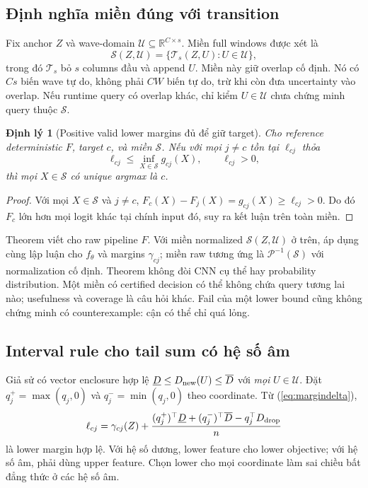 \documentclass[11pt,a4paper]{article}
\newcommand{\R}{\mathbb R}
\newcommand{\Sset}{\mathcal S}
\newcommand{\Uset}{\mathcal U}
\newtheorem{theorem}[proposition]{Định lý}
\theoremstyle{definition}
\begin{document}
\subsection{Định nghĩa miền đúng với transition}
Fix anchor $Z$ và wave-domain $\Uset\subseteq\R^{C\times s}$. Miền full
windows được xét là
\begin{equation}
\Sset(Z,\Uset)=\{\mathcal T_s(Z,U):U\in\Uset\},
\end{equation}
trong đó $\mathcal T_s$ bỏ $s$ columns đầu và append $U$. Miền này giữ
overlap cố định. Nó có $Cs$ biến wave tự do, không phải $CW$ biến tự do,
trừ khi còn đưa uncertainty vào overlap. Nếu runtime query có overlap
khác, chỉ kiểm $U\in\Uset$ chưa chứng minh query thuộc $\Sset$.

\begin{theorem}[Positive valid lower margins đủ để giữ target]
Cho reference deterministic $F$, target $c$, và miền $\Sset$. Nếu với
mọi $j\ne c$ tồn tại $\ell_{cj}$ thỏa
\begin{equation}
\ell_{cj}\le\inf_{X\in\Sset}g_{cj}(X),\qquad \ell_{cj}>0,
\end{equation}
thì mọi $X\in\Sset$ có unique argmax là $c$.
\end{theorem}
\begin{proof}
Với mọi $X\in\Sset$ và $j\ne c$,
$F_c(X)-F_j(X)=g_{cj}(X)\ge\ell_{cj}>0$. Do đó $F_c$ lớn hơn mọi logit
khác tại chính input đó, suy ra kết luận trên toàn miền.
\end{proof}
Theorem viết cho raw pipeline $F$. Với miền normalized $\Sset(Z,\Uset)$
ở trên, áp dụng cùng lập luận cho $f_\theta$ và margins $\gamma_{cj}$;
miền raw tương ứng là $\mathcal P^{-1}(\Sset)$ với normalization cố định.
Theorem không đòi CNN cụ thể hay probability distribution. Một miền có
certified decision có thể không chứa query tương lai nào; usefulness
và coverage là câu hỏi khác. Fail của một lower bound cũng không chứng
minh có counterexample: cận có thể chỉ quá lỏng.

\subsection{Interval rule cho tail sum có hệ số âm}
Giả sử có vector enclosure hợp lệ
$\underline D\le D_{\rm new}(U)\le\overline D$ với \emph{mọi}
$U\in\Uset$. Đặt $q_j^+=\max(q_j,0)$ và
$q_j^-=\min(q_j,0)$ theo coordinate. Từ
(\ref{eq:margindelta}),
\begin{equation}
\ell_{cj}=\gamma_{cj}(Z)+\frac{(q_j^+)^\top\underline D+
(q_j^-)^\top\overline D-q_j^\top D_{\rm drop}}n
\label{eq:tailcert}
\end{equation}
là lower margin hợp lệ. Với hệ số dương, lower feature cho lower
objective; với hệ số âm, phải dùng upper feature. Chọn lower cho mọi
coordinate làm sai chiều bất đẳng thức ở các hệ số âm.
\end{document}
